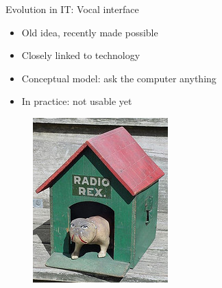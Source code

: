 \documentclass{beamer}
\begin{document}
\begin{frame}{Evolution in IT: Vocal interface}
\begin{itemize}
\item Old idea, recently made possible
\item Closely linked to technology
\item Conceptual model: ask the computer anything
\item In practice: not usable yet
\end{itemize}
\begin{figure}[ht]
\begin{minipage}[b]{0.30\linewidth}
\centering
\includegraphics[width=\textwidth]{radio-rex.jpg}



\end{minipage}
\end{figure}
\end{frame}
\end{document}
